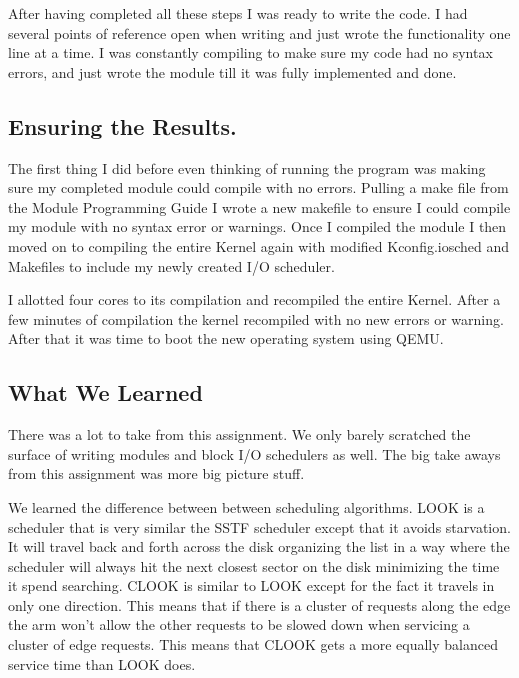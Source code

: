 \documentclass[onecolumn, draftclsnofoot,10pt, compsoc]{IEEEtran}
\begin{document}
            After having completed all these steps I was ready to write the code. I had several points of reference open when writing and just wrote the functionality one line at a time. I was constantly compiling to make sure my code had no syntax errors, and just wrote the module till it was fully implemented and done.
            
        \subsection{Ensuring the Results.}
            The first thing I did before even thinking of running the program was making sure my completed module could compile with no errors. Pulling a make file from the Module Programming Guide \cite{tldp-web:3} I wrote a new makefile to ensure I could compile my module with no syntax error or warnings. Once I compiled the module I then moved on to compiling the entire Kernel again with modified Kconfig.iosched and Makefiles to include my newly created I/O scheduler.
            
            I allotted four cores to its compilation and recompiled the entire Kernel. After a few minutes of compilation the kernel recompiled with no new errors or warning. After that it was time to boot the new operating system using QEMU.
            
        \subsection{What We Learned}
            There was a lot to take from this assignment. We only barely scratched the surface of writing modules and block I/O schedulers as well. The big take aways from this assignment was more big picture stuff. 
            
            We learned the difference between between scheduling algorithms. LOOK is a scheduler that is very similar the SSTF scheduler except that it avoids starvation. It will travel back and forth across the disk organizing the list in a way where the scheduler will always hit the next closest sector on the disk minimizing the time it spend searching. CLOOK is similar to LOOK except for the fact it travels in only one direction. This means that if there is a cluster of requests along the edge the arm won't allow the other requests to be slowed down when servicing a cluster of edge requests. This means that CLOOK gets a more equally balanced service time than LOOK does.
            
\end{document}
